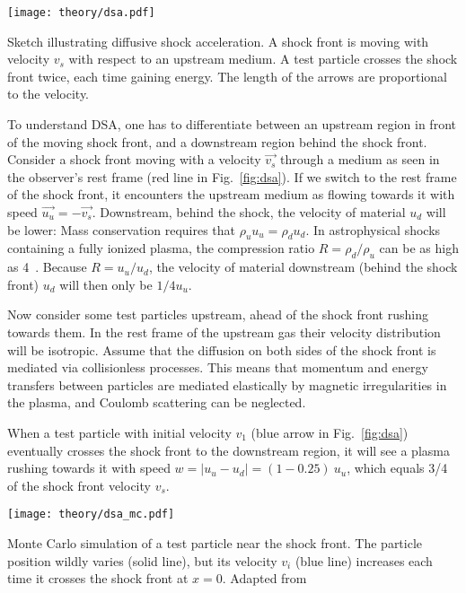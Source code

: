 \begin{marginfigure}
  \texttt{[image: theory/dsa.pdf]}
  \caption[Diffusive shock acceleration]{Sketch illustrating diffusive shock acceleration. A shock front is moving with velocity $v_s$ with respect to an upstream medium. A test particle crosses the shock front twice, each time gaining energy. The length of the arrows are proportional to the velocity.}
\end{marginfigure}

To understand DSA, one has to differentiate between an upstream region in front of the moving shock front, and a downstream region behind the shock front. Consider a shock front moving with a velocity $\vec{v_s}$ through a medium as seen in the observer's rest frame (red line in Fig.~\ref{fig:dsa}). If we switch to the rest frame of the shock front, it encounters the upstream medium as flowing towards it with speed $\vec{u_u}=-\vec{v_s}$. Downstream, behind the shock, the velocity of material $u_d$ will be lower: Mass conservation requires that $\rho_u u_u = \rho_d u_d$. In astrophysical shocks containing a fully ionized plasma, the compression ratio $R=\rho_d/\rho_u$ can be as high as 4~. Because $R=u_u/u_d$, the velocity of material downstream (behind the shock front) $u_d$ will then only be $1/4 u_u$.

Now consider some test particles upstream, ahead of the shock front rushing towards them. In the rest frame of the upstream gas their velocity distribution will be isotropic. Assume that the diffusion on both sides of the shock front is mediated via collisionless processes. This means that momentum and energy transfers between particles are mediated elastically by magnetic irregularities in the plasma, and Coulomb scattering can be neglected.

When a test particle with initial velocity $v_1$ (blue arrow in Fig.~\ref{fig:dsa}) eventually crosses the shock front to the downstream region, it will see a plasma rushing towards it with speed $w=|u_u-u_d| = (1-0.25)~u_u$, which equals 3/4 of the shock front velocity $v_s$.

\begin{marginfigure}
  \texttt{[image: theory/dsa\_mc.pdf]}
  \caption[DSA Monte Carlo]{Monte Carlo simulation of a test particle near the shock front. The particle position wildly varies (solid line), but its velocity $v_i$ (blue line) increases each time it crosses the shock front at $x=0$. Adapted from~\cite{Baring1997}}
\end{marginfigure}

